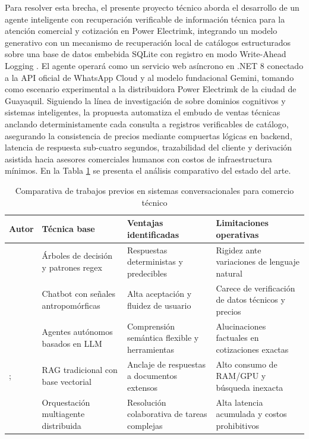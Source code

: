 Para resolver esta brecha, el presente proyecto técnico aborda el desarrollo de un agente inteligente con recuperación verificable de información técnica para la atención comercial y cotización en Power Electrimk, integrando un modelo generativo con un mecanismo de recuperación local de catálogos estructurados sobre una base de datos embebida SQLite con registro en modo Write-Ahead Logging \parencite{gaffney2022sqlite}. El agente operará como un servicio web asíncrono en .NET 8 conectado a la API oficial de WhatsApp Cloud y al modelo fundacional Gemini, tomando como escenario experimental a la distribuidora Power Electrimk de la ciudad de Guayaquil. Siguiendo la línea de investigación de \textcite{Ayala-Carabajo2026} sobre dominios cognitivos y sistemas inteligentes, la propuesta automatiza el embudo de ventas técnicas anclando deterministamente cada consulta a registros verificables de catálogo, asegurando la consistencia de precios mediante compuertas lógicas en backend, latencia de respuesta sub-cuatro segundos, trazabilidad del cliente y derivación asistida hacia asesores comerciales humanos con costos de infraestructura mínimos. En la Tabla \ref{tab:trabajos_previos} se presenta el análisis comparativo del estado del arte.

\begin{table}[H]
\centering
\caption{Comparativa de trabajos previos en sistemas conversacionales para comercio técnico}
\label{tab:trabajos_previos}
\small
\setlength{\tabcolsep}{4.5pt}
\begin{tabular}{>{\raggedright\arraybackslash}p{2.9cm} >{\raggedright\arraybackslash}p{3.8cm} >{\raggedright\arraybackslash}p{3.9cm} >{\raggedright\arraybackslash}p{3.9cm}}
\toprule
\textbf{Autor} & \textbf{Técnica base} & \textbf{Ventajas identificadas} & \textbf{Limitaciones operativas} \\
\midrule
\textcite{adamopoulou2020chatbots} & Árboles de decisión y patrones regex & Respuestas deterministas y predecibles & Rigidez ante variaciones de lenguaje natural \\
\addlinespace
\textcite{adam2021chatbots} & Chatbot con señales antropomórficas & Alta aceptación y fluidez de usuario & Carece de verificación de datos técnicos y precios \\
\addlinespace
\textcite{wang2024survey} & Agentes autónomos basados en LLM & Comprensión semántica flexible y herramientas & Alucinaciones factuales en cotizaciones exactas \\
\addlinespace
\textcite{lewis2020retrieval}; \textcite{gao2023retrieval} & RAG tradicional con base vectorial & Anclaje de respuestas a documentos extensos & Alto consumo de RAM/GPU y búsqueda inexacta \\
\addlinespace
\textcite{wu2023autogen} & Orquestación multiagente distribuida & Resolución colaborativa de tareas complejas & Alta latencia acumulada y costos prohibitivos \\
\bottomrule
\end{tabular}
\end{table}
